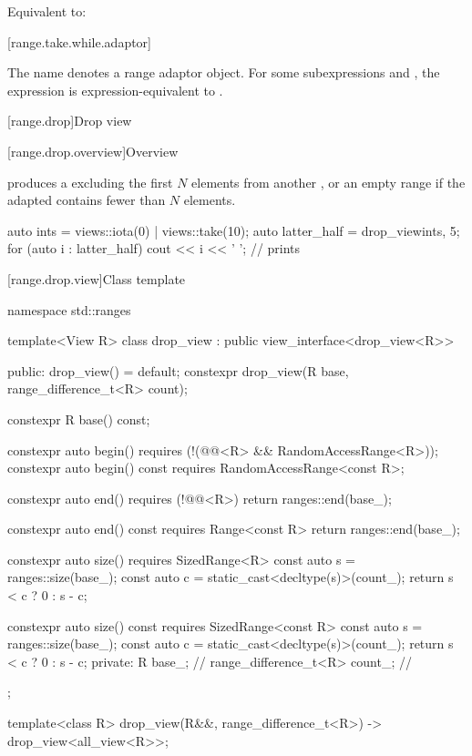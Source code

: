 \begin{itemdescr}
\pnum
\effects
Equivalent to:
\end{itemdescr}

[range.take.while.adaptor]{}

%
\pnum
The name  denotes
a range adaptor object.
For some subexpressions  and ,
the expression 
is expression-equivalent to .

[range.drop]{Drop view}

[range.drop.overview]{Overview}

\pnum
{} produces a 
excluding the first $N$ elements from another , or
an empty range if the adapted  contains fewer than $N$ elements.

\pnum
\begin{example}
\begin{codeblock}
auto ints = views::iota(0) | views::take(10);
auto latter_half = drop_view{ints, 5};
for (auto i : latter_half) {
  cout << i << ' ';                             // prints 
}
\end{codeblock}
\end{example}

[range.drop.view]{Class template }

%
\begin{codeblock}
namespace std::ranges {
  template<View R>
  class drop_view : public view_interface<drop_view<R>> {
  public:
    drop_view() = default;
    constexpr drop_view(R base, range_difference_t<R> count);

    constexpr R base() const;

    constexpr auto begin()
      requires (!(@@<R> && RandomAccessRange<R>));
    constexpr auto begin() const
      requires RandomAccessRange<const R>;

    constexpr auto end()
      requires (!@@<R>)
    { return ranges::end(base_); }

    constexpr auto end() const
      requires Range<const R>
    { return ranges::end(base_); }

    constexpr auto size()
      requires SizedRange<R>
    {
      const auto s = ranges::size(base_);
      const auto c = static_cast<decltype(s)>(count_);
      return s < c ? 0 : s - c;
    }

    constexpr auto size() const
      requires SizedRange<const R>
    {
      const auto s = ranges::size(base_);
      const auto c = static_cast<decltype(s)>(count_);
      return s < c ? 0 : s - c;
    }
  private:
    R base_;                                    // \expos
    range_difference_t<R> count_;               // \expos
  };

  template<class R>
    drop_view(R&&, range_difference_t<R>) -> drop_view<all_view<R>>;
}
\end{codeblock}

